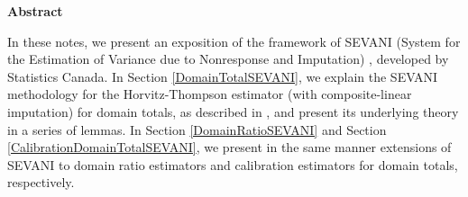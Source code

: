 

\begin{center}
\begin{minipage}{5.5in}
\begin{center}
\textbf{\large Abstract}
\end{center}
In these notes, we present an exposition of the framework of SEVANI
(System for the Estimation of Variance due to Nonresponse and Imputation) \cite{Beaumont2011},
developed by Statistics Canada.
In Section \ref{DomainTotalSEVANI},
we explain the SEVANI methodology for the Horvitz-Thompson estimator
(with composite-linear imputation) for domain totals,
as described in \cite{Beaumont2011}, and present its underlying theory in a series of lemmas. 
In Section \ref{DomainRatioSEVANI} and Section \ref{CalibrationDomainTotalSEVANI},
we present in the same manner extensions of SEVANI to domain ratio estimators and
calibration estimators for domain totals, respectively.
\end{minipage}
\end{center}

